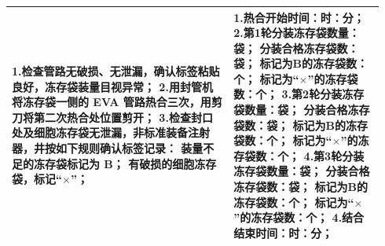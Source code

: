 \documentclass[UTF8,10pt,a4paper,fontset=fandol]{ctexart}
\begin{document}
\begin{tabular}{|p{0.56\linewidth}|p{0.38\linewidth}|}
\hline
1.检查管路无破损、无泄漏，确认标签粘贴良好，冻存袋装量目视异常；\newline
2.用封管机将冻存袋一侧的 EVA 管路热合三次，用剪刀将第二次热合处位置剪开；\newline
3.检查封口处及细胞冻存袋无泄漏，非标准装备注射器，井按如下规则确认标签记录：\newline
装量不足的冻存袋标记为 B；\newline
有破损的细胞冻存袋，标记“$\times$”；
&
1.热合开始时间：\underline{\hspace{0.35cm}}时：\underline{\hspace{0.35cm}}分；\newline
2.第1轮分装冻存袋数量：\underline{\hspace{0.3cm}}袋；\newline
\hspace{0.4cm}分装合格冻存袋数：\underline{\hspace{0.3cm}}袋；\newline
\hspace{0.4cm}标记为B的冻存袋数：\underline{\hspace{0.3cm}}个；\newline
\hspace{0.4cm}标记为“$\times$”的冻存袋数：\underline{\hspace{0.3cm}}个；\newline
3.第2轮分装冻存袋数量：\underline{\hspace{0.3cm}}袋；\newline
\hspace{0.4cm}分装合格冻存袋数：\underline{\hspace{0.3cm}}袋；\newline
\hspace{0.4cm}标记为B的冻存袋数：\underline{\hspace{0.3cm}}个；\newline
\hspace{0.4cm}标记为“$\times$”的冻存袋数：\underline{\hspace{0.3cm}}个；\newline
4.第3轮分装冻存袋数量：\underline{\hspace{0.3cm}}袋；\newline
\hspace{0.4cm}分装合格冻存袋数：\underline{\hspace{0.3cm}}袋；\newline
\hspace{0.4cm}标记为B的冻存袋数：\underline{\hspace{0.3cm}}个；\newline
\hspace{0.4cm}标记为“$\times$”的冻存袋数：\underline{\hspace{0.3cm}}个；\newline
4.结合结束时间：\underline{\hspace{0.35cm}}时：\underline{\hspace{0.35cm}}分；
\\
\hline
\end{tabular}
\end{document}
